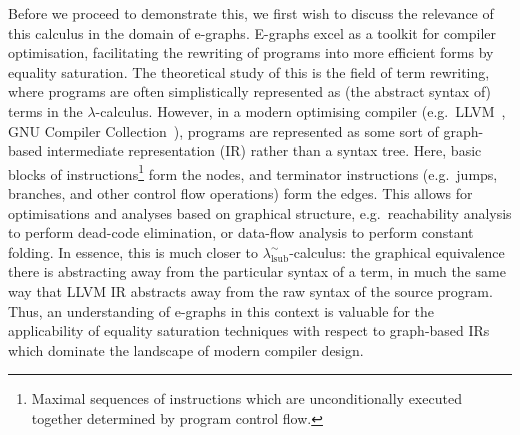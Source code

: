 Before we proceed to demonstrate this, we first wish to discuss the relevance of this calculus in the domain of e-graphs.
E-graphs excel as a toolkit for compiler optimisation, facilitating the rewriting of programs into more efficient forms by equality saturation.
The theoretical study of this is the field of term rewriting, where programs are often simplistically represented as (the abstract syntax of) terms in the $\lambda$-calculus.
However, in a modern optimising compiler (e.g.\ LLVM~\cite{lattnerLLVMCompilationFramework2004}, GNU Compiler Collection~\cite{merrillGenericGimpleNew2003}), programs are represented as some sort of graph-based intermediate representation (IR) rather than a syntax tree.
Here, basic blocks of instructions\footnote{Maximal sequences of instructions which are unconditionally executed together determined by program control flow.} form the nodes, and terminator instructions (e.g.\ jumps, branches, and other control flow operations) form the edges.
This allows for optimisations and analyses based on graphical structure, e.g.\ reachability analysis to perform dead-code elimination, or data-flow analysis to perform constant folding.
In essence, this is much closer to $\lambda^\sim_{\text{lsub}}$-calculus: the graphical equivalence there is abstracting away from the particular syntax of a term, in much the same way that LLVM IR abstracts away from the raw syntax of the source program.
Thus, an understanding of e-graphs in this context is valuable for the applicability of equality saturation techniques with respect to graph-based IRs which dominate the landscape of modern compiler design.

